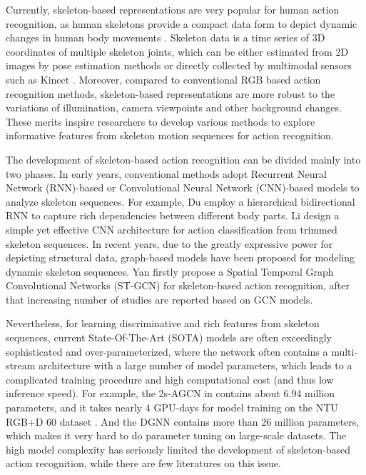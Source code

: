 \documentclass[10pt,journal,compsoc]{IEEEtran}
\begin{document}
Currently, skeleton-based representations are very popular for human action recognition, as human skeletons provide a compact data form to depict dynamic changes in human body movements \cite{johansson1973visual}. Skeleton data is a time series of 3D coordinates of multiple skeleton joints, which can be either estimated from 2D images by pose estimation methods \cite{cao2017realtime} or directly collected by multimodal sensors such as Kinect \cite{zhang2012microsoft}. Moreover, compared to conventional RGB based action recognition methods, skeleton-based representations are more robust to the variations of illumination, camera viewpoints and other background changes. These merits inspire researchers to develop various methods to explore informative features from skeleton motion sequences for action recognition.

The development of skeleton-based action recognition can be divided mainly into two phases. In early years, conventional methods adopt Recurrent Neural Network (RNN)-based or Convolutional Neural Network (CNN)-based models to analyze skeleton sequences. For example, Du \etal \cite{du2015hierarchical} employ a hierarchical bidirectional RNN to capture rich dependencies between different body parts. Li \etal \cite{li2017skeleton} design a simple yet effective CNN architecture for action classification from trimmed skeleton sequences. In recent years, due to the greatly expressive power for depicting structural data, graph-based models \cite{kipf2016semi,li2018adaptive} have been proposed for modeling dynamic skeleton sequences. Yan \etal \cite{yan2018spatial} firstly propose a Spatial Temporal Graph Convolutional Networks (ST-GCN) for skeleton-based action recognition, after that increasing number of studies \cite{zhang2019graph,shi2019two,song2019richly} are reported based on GCN models.

Nevertheless, for learning discriminative and rich features from skeleton sequences, current State-Of-The-Art (SOTA) models are often exceedingly sophisticated and over-parameterized, where the network often contains a multi-stream architecture with a large number of model parameters, which leads to a complicated training procedure and high computational cost (and thus low inference speed). For example, the 2s-AGCN in \cite{shi2019two} contains about 6.94 million parameters, and it takes nearly 4 GPU-days for model training on the NTU RGB+D 60 dataset \cite{shahroudy2016ntu}. And the DGNN \cite{shi2019skeleton} contains more than 26 million parameters, which makes it very hard to do parameter tuning on large-scale datasets. The high model complexity has seriously limited the development of skeleton-based action recognition, while there are few literatures on this issue.
\end{document}
